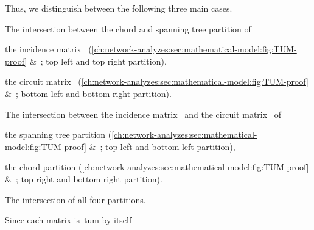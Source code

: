 Thus, we distinguish between the following three main cases.
% 
\begin{compactenum}
    \item The intersection between the chord and spanning tree partition of
    \label{ch:network-analyzes:sec:mathematical-model:cases:1}
    \begin{compactenum}[\hspace*{-11mm}(a)]
        \item the incidence matrix~ (\cref{ch:network-analyzes:sec:mathematical-model:fig:TUM-proof}
        \&~; top left and top right partition),
        \label{ch:network-analyzes:sec:mathematical-model:cases:1a}
        \item the circuit matrix~ 
        (\cref{ch:network-analyzes:sec:mathematical-model:fig:TUM-proof}
        \&~; bottom left and bottom right partition).
        \label{ch:network-analyzes:sec:mathematical-model:cases:1b}
    \end{compactenum}
    \item The intersection between the incidence matrix~
    and the circuit matrix~ of
    \label{ch:network-analyzes:sec:mathematical-model:cases:2}
    \begin{compactenum}[\hspace*{-11mm}(a)]
        \item the spanning tree partition 
        (\cref{ch:network-analyzes:sec:mathematical-model:fig:TUM-proof}
        \&~; top left and bottom left partition), 
        \label{ch:network-analyzes:sec:mathematical-model:cases:2a}
        \item the chord partition 
        (\cref{ch:network-analyzes:sec:mathematical-model:fig:TUM-proof}
        \&~; top right and bottom right partition).
        \label{ch:network-analyzes:sec:mathematical-model:cases:2b}
    \end{compactenum}
    \item The intersection of all four partitions.
    \label{ch:network-analyzes:sec:mathematical-model:cases:3}
\end{compactenum}
% 
Since each matrix is~\gls{tum} by itself
